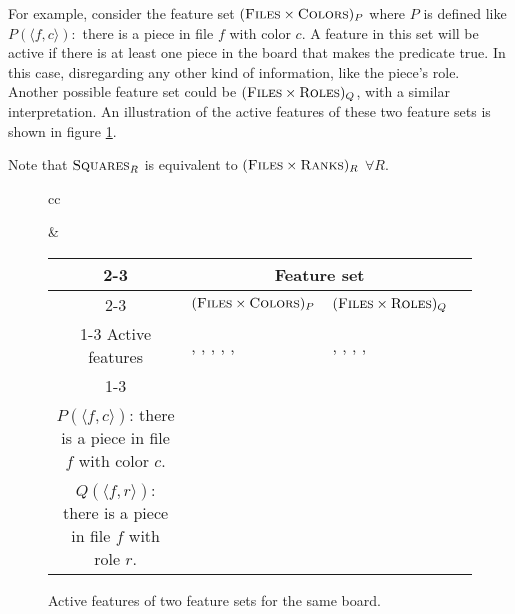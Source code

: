 
For example, consider the feature set $(\textsc{Files} \times \textsc{Colors})_{P}$ where $P$ is defined like $P(\langle f, c \rangle): $ there is a piece in file $f$ with color $c$. A feature in this set will be active if there is at least one piece in the board that makes the predicate true. In this case, disregarding any other kind of information, like the piece's role.
Another possible feature set could be $(\textsc{Files} \times \textsc{Roles})_{Q}$, with a similar interpretation. An illustration of the active features of these two feature sets is shown in figure \ref{fig:active_features}.

Note that $\textsc{Squares}_R$ is equivalent to $(\textsc{Files} \times \textsc{Ranks})_R$ $\forall R$.

\begin{figure}[H]
\centering

\begin{tabular}{cc}
\raisebox{-7ex}{
\chessboard[
    tinyboard,
    showmover=false,
    hlabel=false,
    setwhite={kc3, nc2, pa2, Pd4},
    addblack={Kc8,bh7, pa7}
]
}

&

\begin{tabular}{|c|p{4cm}|p{4cm}|p{0cm}}
\cline{2-3}
\multicolumn{1}{c|}{} & \multicolumn{2}{c|}{\centering Feature set} \\
\cline{2-3}
\multicolumn{1}{c|}{} & \centering $(\textsc{Files} \times \textsc{Colors})_{P}$ & \centering $(\textsc{Files} \times \textsc{Roles})_{Q}$ & \\
\cline{1-3}
Active features &
\feature{a, \white}, \feature{a, \black}, \feature{c, \black}, \feature{c, \white}, \feature{d, \white}, \feature{h, \black} &
\feature{a, \sympawn}, \feature{c, \symking}, \feature{c, \symknight}, \feature{d, \sympawn}, \feature{h, \symbishop} \\
\cline{1-3}

\multicolumn{3}{c}{
\makecell{
~\\
$P(\langle f,c \rangle)$: there is a piece in file $f$ with color $c$.\\
$Q(\langle f,r \rangle)$: there is a piece in file $f$ with role $r$.
}    
}

\end{tabular}
\end{tabular}

\caption{Active features of two feature sets for the same board.}
\label{fig:active_features}
\end{figure}

